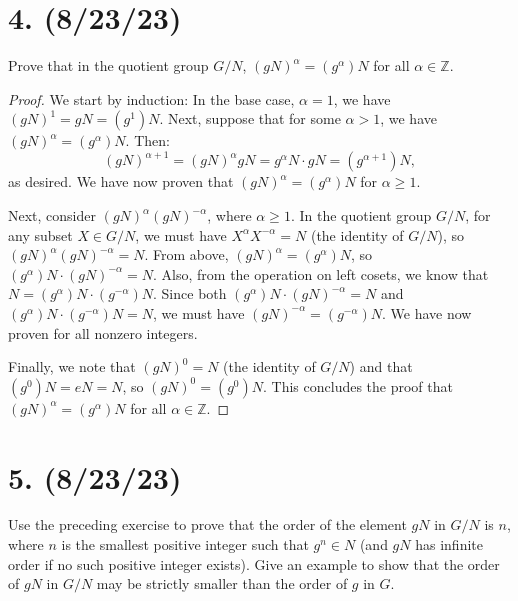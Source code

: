 \documentclass{article}
\begin{document}
\section*{4. (8/23/23)}

Prove that in the quotient group $G/N$, $(gN)^\alpha = (g^\alpha)N$ for all $\alpha \in \mathbb{Z}$.

\begin{proof}
    We start by induction: In the base case, $\alpha = 1$, we have $(gN)^1 = gN = (g^1)N$. Next, suppose that for some $\alpha > 1$, we have $(gN)^\alpha = (g^\alpha)N$. Then:
    \begin{equation*}
        (gN)^{\alpha + 1} = (gN)^\alpha gN = g^\alpha N \cdot gN = (g^{\alpha + 1})N,
    \end{equation*}
    as desired. We have now proven that $(gN)^\alpha = (g^\alpha)N$ for $\alpha \geq 1$.

    Next, consider $(gN)^\alpha (gN)^{-\alpha}$, where $\alpha \geq 1$. In the quotient group $G/N$, for any subset $X \in G/N$, we must have $X^\alpha X^{-\alpha} = N$ (the identity of $G/N$), so $(gN)^\alpha (gN)^{-\alpha} = N$. From above, $(gN)^\alpha = (g^\alpha)N$, so $(g^\alpha)N \cdot (gN)^{-\alpha} = N$. Also, from the operation on left cosets, we know that $N = (g^\alpha)N \cdot (g^{-\alpha})N$. Since both $(g^\alpha)N \cdot (gN)^{-\alpha} = N$ and $(g^\alpha)N \cdot (g^{-\alpha})N = N$, we must have $(gN)^{-\alpha} = (g^{-\alpha})N$. We have now proven for all nonzero integers.

    Finally, we note that $(gN)^0 = N$ (the identity of $G/N$) and that $(g^0)N = eN = N$, so $(gN)^0 = (g^0)N$. This concludes the proof that $(gN)^\alpha = (g^\alpha)N$ for all $\alpha \in \mathbb{Z}$.
\end{proof}

\section*{5. (8/23/23)}

Use the preceding exercise to prove that the order of the element $gN$ in $G/N$ is $n$, where $n$ is the smallest positive integer such that $g^n \in N$ (and $gN$ has infinite order if no such positive integer exists). Give an example to show that the order of $gN$ in $G/N$ may be strictly smaller than the order of $g$ in $G$.
\end{document}
